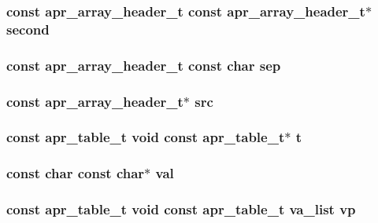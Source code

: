 \subsubsection[{\texorpdfstring{second}{second}}]{\setlength{\rightskip}{0pt plus 5cm}const {\bf apr\+\_\+array\+\_\+header\+\_\+t} const {\bf apr\+\_\+array\+\_\+header\+\_\+t}$\ast$ second}\hypertarget{group__apr__tables_gade8df35e4d83c24788cf409262f7fc51}{}\label{group__apr__tables_gade8df35e4d83c24788cf409262f7fc51}
\subsubsection[{\texorpdfstring{sep}{sep}}]{\setlength{\rightskip}{0pt plus 5cm}const {\bf apr\+\_\+array\+\_\+header\+\_\+t} const char sep}\hypertarget{group__apr__tables_ga37d96adf842aef6b03690e17874c9ed8}{}\label{group__apr__tables_ga37d96adf842aef6b03690e17874c9ed8}
\subsubsection[{\texorpdfstring{src}{src}}]{\setlength{\rightskip}{0pt plus 5cm}const {\bf apr\+\_\+array\+\_\+header\+\_\+t}$\ast$ src}\hypertarget{group__apr__tables_gab6e7405500bdd51690dc9ef83744684f}{}\label{group__apr__tables_gab6e7405500bdd51690dc9ef83744684f}
\subsubsection[{\texorpdfstring{t}{t}}]{ const {\bf apr\+\_\+table\+\_\+t} {\bf void} const {\bf apr\+\_\+table\+\_\+t}$\ast$ t}\hypertarget{group__apr__tables_gad0d127e044cb4fd448cde5c19d10179e}{}\label{group__apr__tables_gad0d127e044cb4fd448cde5c19d10179e}
\subsubsection[{\texorpdfstring{val}{val}}]{\setlength{\rightskip}{0pt plus 5cm}const char const char$\ast$ val}\hypertarget{group__apr__tables_ga4d708cd93abeca73400ed82977502830}{}\label{group__apr__tables_ga4d708cd93abeca73400ed82977502830}
\subsubsection[{\texorpdfstring{vp}{vp}}]{ const {\bf apr\+\_\+table\+\_\+t} {\bf void} const {\bf apr\+\_\+table\+\_\+t} va\+\_\+list vp}\hypertarget{group__apr__tables_ga8ca169f10741c89e389d179f952e4dc9}{}\label{group__apr__tables_ga8ca169f10741c89e389d179f952e4dc9}
